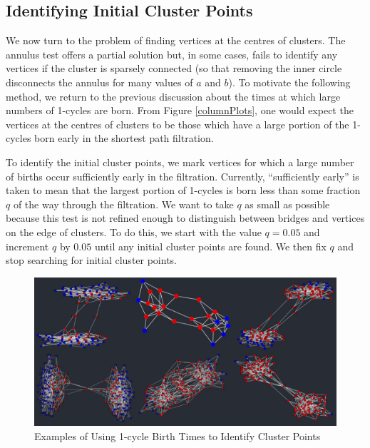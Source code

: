 \documentclass[12pt,a4paper]{amsart}
\numberwithin{equation}{section}
\theoremstyle{plain}
\theoremstyle{definition}
\begin{document}
\subsection*{Identifying Initial Cluster Points}

We now turn to the problem of finding vertices at the centres of clusters. The annulus test offers a partial solution but, in some cases, fails to identify any vertices if the cluster is sparsely connected (so that removing the inner circle disconnects the annulus for many values of $a$ and $b$). To motivate the following method, we return to the previous discussion about the times at which large numbers of 1-cycles are born. From Figure \ref{columnPlots}, one would expect the vertices at the centres of clusters to be those which have a large portion of the 1-cycles born early in the shortest path filtration. 

To identify the initial cluster points, we mark vertices for which a large number of births occur sufficiently early in the filtration. Currently, ``sufficiently early'' is taken to mean that the largest portion of 1-cycles is born less than some fraction $q$ of the way through the filtration. We want to take $q$ as small as possible because this test is not refined enough to distinguish between bridges and vertices on the edge of clusters. To do this, we start with the value $q=0.05$ and increment $q$ by $0.05$ until any initial cluster points are found. We then fix $q$ and stop searching for initial cluster points. 

\begin{figure}[h]
	\centering
	\includegraphics[scale=0.55]{InitialClusterPoints.jpg}
	\caption{Examples of Using 1-cycle Birth Times to Identify Cluster Points}
	\label{birthTimesTest}
\end{figure}

\newpage
\end{document}
